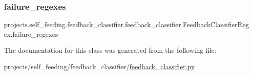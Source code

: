 \subsubsection{\texorpdfstring{failure\+\_\+regexes}{failure\_regexes}}
{\footnotesize\ttfamily projects.\+self\+\_\+feeding.\+feedback\+\_\+classifier.\+feedback\+\_\+classifier.\+Feedback\+Classifier\+Regex.\+failure\+\_\+regexes}



The documentation for this class was generated from the following file\+:\begin{DoxyCompactItemize}
\item 
projects/self\+\_\+feeding/feedback\+\_\+classifier/\hyperlink{feedback__classifier_8py}{feedback\+\_\+classifier.\+py}\end{DoxyCompactItemize}
